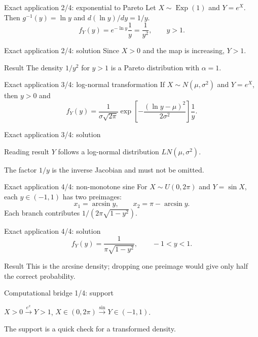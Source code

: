 \documentclass[10pt,aspectratio=169]{beamer}
\begin{document}
\begin{frame}{Exact application 2/4: exponential to Pareto}
  \footnotesize
  Let $X\sim\operatorname{Exp}(1)$ and $Y=e^X$. Then $g^{-1}(y)=\ln y$ and
  $d(\ln y)/dy=1/y$.
  \[
    f_Y(y)=e^{-\ln y}\frac1y=\frac1{y^2},\qquad y>1.
  \]
\end{frame}

\begin{frame}{Exact application 2/4: solution}
  \footnotesize
  Since $X>0$ and the map is increasing, $Y>1$.
  \begin{alertblock}{Result}
    The density $1/y^2$ for $y>1$ is a Pareto distribution with $\alpha=1$.
  \end{alertblock}
\end{frame}

\begin{frame}{Exact application 3/4: log-normal transformation}
  \footnotesize
  If $X\sim N(\mu,\sigma^2)$ and $Y=e^X$, then $y>0$ and
  \[
    f_Y(y)=\frac{1}{\sigma\sqrt{2\pi}}
    \exp\!\left[-\frac{(\ln y-\mu)^2}{2\sigma^2}\right]\frac1y.
  \]
\end{frame}

\begin{frame}{Exact application 3/4: solution}
  \footnotesize
  \begin{block}{Reading result}
    $Y$ follows a log-normal distribution $LN(\mu,\sigma^2)$.
  \end{block}
  The factor $1/y$ is the inverse Jacobian and must not be omitted.
\end{frame}

\begin{frame}{Exact application 4/4: non-monotone sine}
  \footnotesize
  For $X\sim U(0,2\pi)$ and $Y=\sin X$, each $y\in(-1,1)$ has two preimages:
  \[
    x_1=\arcsin y,\qquad x_2=\pi-\arcsin y.
  \]
  Each branch contributes $1/(2\pi\sqrt{1-y^2})$.
\end{frame}

\begin{frame}{Exact application 4/4: solution}
  \footnotesize
  \[
    f_Y(y)=\frac{1}{\pi\sqrt{1-y^2}},\qquad -1<y<1.
  \]
  \begin{alertblock}{Result}
    This is the arcsine density; dropping one preimage would give only half the
    correct probability.
  \end{alertblock}
\end{frame}

\begin{frame}{Computational bridge 1/4: support}
  \footnotesize
  \begin{center}
    $X>0\xrightarrow{e^x}Y>1$,\qquad
    $X\in(0,2\pi)\xrightarrow{\sin}Y\in(-1,1)$.
  \end{center}
  The support is a quick check for a transformed density.
\end{frame}
\end{document}
